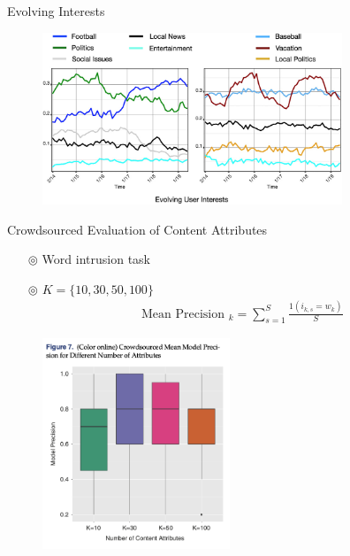 \documentclass{beamer}
\begin{document}
\begin{frame}{Evolving Interests}
	\begin{figure}[htpb]
		\centering
		\includegraphics[width=0.8\textwidth]{pic/evolving-interests.png}
	\end{figure}
\end{frame}

\begin{frame}[allowframebreaks]{Crowdsourced Evaluation of Content Attributes}
	\begin{itemize}
		\item[$\circledcirc$]  Word intrusion task
		\item[$\circledcirc$] $K=\{10,30,50,100\}$
		      \begin{align*}
			      \text { Mean Precision }_k=\sum_{s=1}^S \frac{1\left(i_{k, s}=w_k\right)}{S}
		      \end{align*}
	\end{itemize}

	\begin{figure}[htpb]
		\centering
		\includegraphics[width=0.5\textwidth]{pic/intrusion-prec.png}
	\end{figure}
\end{frame}
\end{document}
